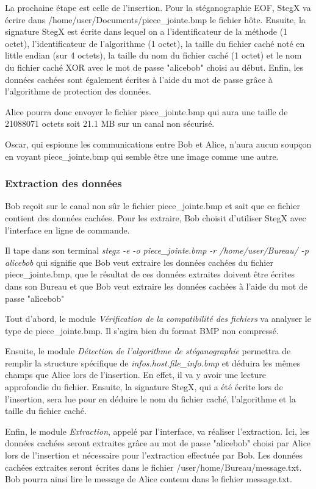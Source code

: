 \documentclass[11pt]{article}
\begin{document}
La prochaine étape est celle de l'insertion. Pour la stéganographie EOF, 
StegX va écrire dans /home/user/Documents/piece\_jointe.bmp le fichier hôte. 
Ensuite, la signature StegX est écrite dans lequel on a l'identificateur 
de la méthode (1 octet), l'identificateur de l'algorithme (1 octet), la 
taille du fichier caché noté en little endian (sur 4 octets), la taille du 
nom du fichier caché (1 octet) et le nom du fichier caché XOR avec le mot 
de passe "alicebob" choisi au début. 
Enfin, les données cachées sont également écrites à l'aide du mot de passe
grâce à l'algorithme de protection des données. 

Alice pourra donc envoyer le fichier piece\_jointe.bmp qui aura une taille 
de 21088071 octets soit 21.1 MB sur un canal non sécurisé. 

Oscar, qui espionne les communications entre Bob et Alice, n'aura aucun 
soupçon en voyant piece\_jointe.bmp qui semble être une image comme une 
autre. 

\subsubsection{Extraction des données}

Bob reçoit sur le canal non sûr le fichier piece\_jointe.bmp et sait que 
ce fichier contient des données cachées. Pour les extraire, Bob choisit 
d'utiliser StegX avec l'interface en ligne de commande. 

Il tape dans son terminal \textit{stegx -e -o piece\_jointe.bmp -r 
/home/user/Bureau/ -p alicebob} qui signifie que Bob veut extraire les 
données cachées du fichier piece\_jointe.bmp, que le résultat de ces 
données extraites doivent être écrites dans son Bureau et que Bob veut 
extraire les données cachées à l'aide du mot de passe "alicebob"

Tout d'abord, le module \textit{Vérification de la compatibilité des 
fichiers} va analyser le type de piece\_jointe.bmp. Il s'agira bien du 
format BMP non compressé. 

Ensuite, le module \textit{Détection de l'algorithme de stéganographie}
permettra de remplir la structure spécifique de \textit{infos.host.file\_info.bmp}
et déduira les mêmes champs que Alice lors de l'insertion. En effet, 
il va y avoir une lecture approfondie du fichier. Ensuite, la signature 
StegX, qui a été écrite lors de l'insertion, sera lue pour en déduire 
le nom du fichier caché, l'algorithme et la taille du fichier caché. 

Enfin, le module \textit{Extraction}, appelé par l'interface, va réaliser 
l'extraction. Ici, les données cachées seront extraites grâce au mot de passe 
"alicebob" choisi par Alice lors de l'insertion et nécessaire pour l'extraction 
effectuée par Bob. 
Les données cachées extraites seront écrites dans le fichier
/user/home/Bureau/message.txt. Bob pourra ainsi lire le message de Alice 
contenu dans le fichier message.txt. 
\end{document}
